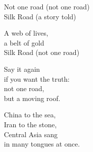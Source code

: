 \begin{lyrics}
Not one road
(not one road)\\
Silk Road
(a story told)

A web of lives,\\
a belt of gold\\
Silk Road
(not one road)

Say it again\\
if you want the truth:\\
not one road,\\
but a moving roof.

China to the sea,\\
Iran to the stone,\\
Central Asia sang\\
in many tongues at once.
\end{lyrics}

